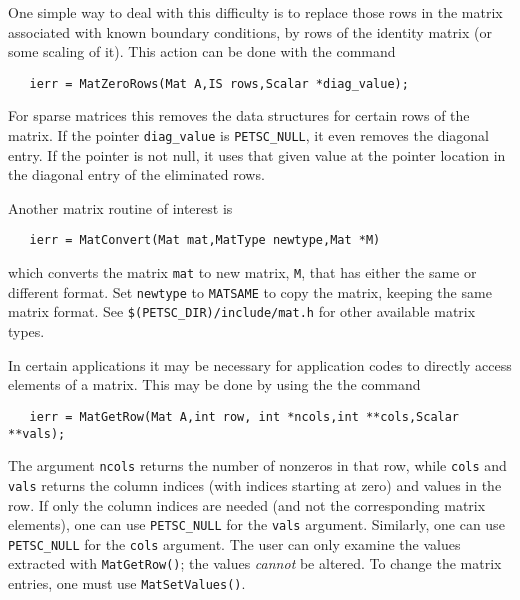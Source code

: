 One simple way to deal with this difficulty is to replace those rows in the 
matrix associated with known boundary conditions, by rows of the 
identity matrix (or some scaling of it). This action can be done with 
the command 
\begin{verbatim}
   ierr = MatZeroRows(Mat A,IS rows,Scalar *diag_value);
\end{verbatim}
For sparse matrices this removes the data structures for certain rows 
of the matrix. If the pointer {\tt diag\_value} is {\tt PETSC\_NULL}, it 
even removes the diagonal entry. If the pointer is not null, it uses that 
given value at the pointer location 
in the diagonal entry of the eliminated rows. 


Another matrix routine of interest is 
\begin{verbatim}
   ierr = MatConvert(Mat mat,MatType newtype,Mat *M)
\end{verbatim}
which converts the matrix {\tt mat} to new matrix, {\tt M}, that has
either the same or different format.  Set {\tt newtype} to {\tt MATSAME}
to copy the matrix, keeping the same matrix format.  See 
{\tt \$(PETSC\_DIR)/include/mat.h} for other available matrix types.

In certain applications it may be necessary for application codes
to directly access elements of a matrix. This may be done by using the 
the command 
\begin{verbatim}
   ierr = MatGetRow(Mat A,int row, int *ncols,int **cols,Scalar **vals);
\end{verbatim}
The argument {\tt ncols} returns the number of nonzeros in that row, 
while {\tt cols} and {\tt vals} returns the column indices (with indices
starting at zero) and values in the row. If only the column 
indices are needed (and not the corresponding matrix elements), one
can use {\tt PETSC\_NULL} for the {\tt vals} argument. Similarly,
one can use {\tt PETSC\_NULL} for the {\tt cols} argument.
The user can only examine the values extracted with {\tt MatGetRow()};
the values {\em cannot} be altered. 
 
To change the matrix entries, one must use {\tt MatSetValues()}.

